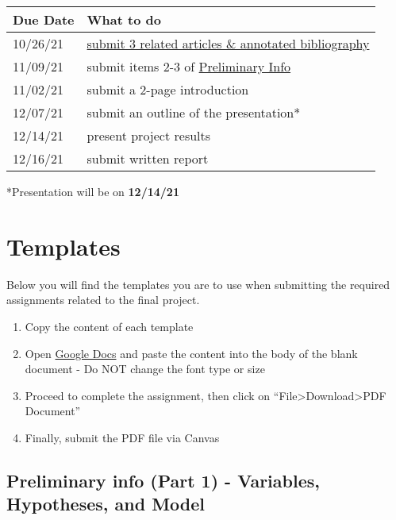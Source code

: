 \documentclass[
]{article}
\providecommand{\tightlist}{%
  \setlength{\itemsep}{0pt}\setlength{\parskip}{0pt}}
\begin{document}
\begin{longtable}[]{@{}ll@{}}
\toprule
Due Date & What to do \\
\midrule
\endhead
10/26/21 & \protect\hyperlink{articles}{submit 3 related articles \& annotated bibliography} \\
11/09/21 & submit items 2-3 of \protect\hyperlink{prelim-info}{Preliminary Info} \\
11/02/21 & submit a 2-page introduction \\
12/07/21 & submit an outline of the presentation* \\
12/14/21 & present project results \\
12/16/21 & submit written report \\
\bottomrule
\end{longtable}

*Presentation will be on \textbf{12/14/21}

\hypertarget{templates}{%
\section{Templates}\label{templates}}

Below you will find the templates you are to use when submitting the required assignments related to the final project.

\begin{enumerate}
\def\labelenumi{\arabic{enumi}.}
\tightlist
\item
  Copy the content of each template
\item
  Open \href{http://docs.google.com}{Google Docs} and paste the content into the body of the blank document - Do NOT change the font type or size
\item
  Proceed to complete the assignment, then click on ``File\textgreater Download\textgreater PDF Document''
\item
  Finally, submit the PDF file via Canvas
\end{enumerate}

\hypertarget{preliminary-info-part-1---variables-hypotheses-and-model}{%
\subsection{Preliminary info (Part 1) - Variables, Hypotheses, and Model}\label{preliminary-info-part-1---variables-hypotheses-and-model}}
\end{document}
